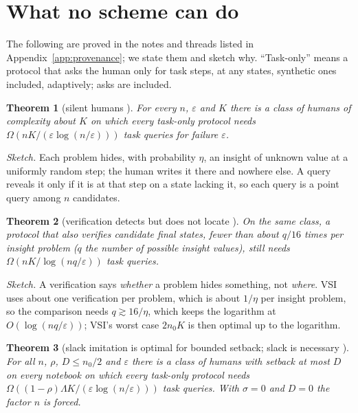 \documentclass[11pt]{article}
\newtheorem{theorem}{Theorem}[section]
\theoremstyle{definition}
\theoremstyle{remark}
\newcommand{\K}{K}
\begin{document}
\section{What no scheme can do}\label{sec:lower}

The following are proved in the notes and threads listed in Appendix~\ref{app:provenance}; we state them and sketch why. ``Task-only'' means a protocol that asks the human only for task steps, at any states, synthetic ones included, adaptively; asks are included.

\begin{theorem}[silent humans \cite{note1}]\label{thm:lb-task}
For every $n$, $\varepsilon$ and $\K$ there is a class of humans of complexity about $\K$ on which every task-only protocol needs $\Omega(n\K/(\varepsilon\log(n/\varepsilon)))$ task queries for failure $\varepsilon$.
\end{theorem}
\emph{Sketch.} Each problem hides, with probability $\eta$, an insight of unknown value at a uniformly random step; the human writes it there and nowhere else. A query reveals it only if it is at that step on a state lacking it, so each query is a point query among $n$ candidates.

\begin{theorem}[verification detects but does not locate \cite{threadQ}]\label{thm:lb-verify}
On the same class, a protocol that also verifies candidate final states, fewer than about $q/16$ times per insight problem ($q$ the number of possible insight values), still needs $\Omega(n\K/\log(nq/\varepsilon))$ task queries.
\end{theorem}
\emph{Sketch.} A verification says \emph{whether} a problem hides something, not \emph{where}. VSI uses about one verification per problem, which is about $1/\eta$ per insight problem, so the comparison needs $q\gtrsim16/\eta$, which keeps the logarithm at $O(\log(nq/\varepsilon))$; VSI's worst case $2n_0\K$ is then optimal up to the logarithm.

\begin{theorem}[slack imitation is optimal for bounded setback; slack is necessary \cite{threadJ}]\label{thm:lb-slack}
For all $n$, $\rho$, $D\le n_0/2$ and $\varepsilon$ there is a class of humans with setback at most $D$ on every notebook on which every task-only protocol needs $\Omega((1-\rho)\Lambda\K/(\varepsilon\log(n/\varepsilon)))$ task queries. With $\sigma=0$ and $D=0$ the factor $n$ is forced.
\end{theorem}
\end{document}
